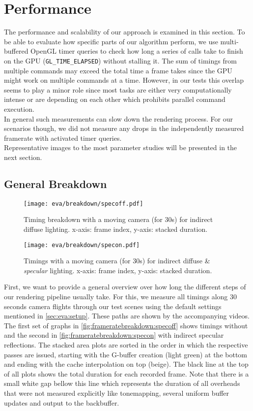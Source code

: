 \documentclass[thesis.tex]{subfiles}
\begin{document}
\section{Performance}
The performance and scalability of our approach is examined in this section.
To be able to evaluate how specific parts of our algorithm perform, we use multi-buffered OpenGL timer queries to check how long a series of calls take to finish on the GPU (\texttt{GL\_TIME\_ELAPSED}) without stalling it.
The sum of timings from multiple commands may exceed the total time a frame takes since the GPU might work on multiple commands at a time.
However, in our tests this overlap seems to play a minor role since most tasks are either very computationally intense or are depending on each other which prohibits parallel command execution.
\\
In general such measurements can slow down the rendering process.
For our scenarios though, we did not measure any drops in the independently measured framerate with activated timer queries.
\\
Representative images to the most parameter studies will be presented in the next section.

\subsection{General Breakdown}
\begin{figure}
\centering
\texttt{[image: eva/breakdown/specoff.pdf]}
\caption{Timing breakdown with a moving camera (for 30s) for indirect diffuse lighting. x-axis: frame index, y-axis: stacked duration.}
\label{fig:frameratebreakdown:specoff}
\end{figure}
\begin{figure}
\centering
\texttt{[image: eva/breakdown/specon.pdf]}
\caption{Timings with a moving camera  (for 30s) for indirect diffuse \& \emph{specular} lighting. x-axis: frame index, y-axis: stacked duration.}
\label{fig:frameratebreakdown:specon}
\end{figure}

First, we want to provide a general overview over how long the different steps of our rendering pipeline usually take.
For this, we measure all timings along 30 seconds camera flights through our test scenes using the default settings mentioned in \autoref{sec:eva:setup}.
These paths are shown by the accompanying videos.
The first set of graphs in \autoref{fig:frameratebreakdown:specoff} shows timings without and the second in \autoref{fig:frameratebreakdown:specon} with indirect specular reflections.
The stacked area plots are sorted in the order in which the respective passes are issued, starting with the G-buffer creation (light green) at the bottom and ending with the cache interpolation on top (beige).
The black line at the top of all plots shows the total duration for each recorded frame.
Note that there is a small white gap bellow this line which represents the duration of all overheads that were not measured explicitly like tonemapping, several uniform buffer updates and output to the backbuffer.
\end{document}
